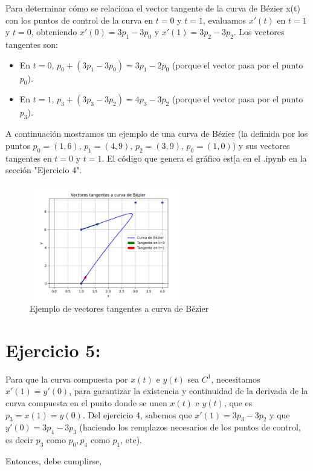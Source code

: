 \documentclass{article}
\begin{document}
Para determinar cómo se relaciona el vector tangente de la curva de Bézier x(t) con los puntos de control de la curva en $t=0$ y $t=1$, evaluamos $x'(t)$ en $t = 1$ y $t = 0$, obteniendo $x'(0) = 3p_1-3p_0$ y $x'(1) = 3p_2-3p_2$. Los vectores tangentes son:
\begin{itemize}
    \item En $t = 0$, $p_0 + (3p_1-3p_0) = 3p_1-2p_0$ (porque el vector pasa por el punto $p_0$).
    \item En $t = 1$, $p_3 +  (3p_3-3p_2) =  4p_3-3p_2$ (porque el vector pasa por el punto $p_3$).
\end{itemize}

A continuación mostramos un ejemplo de una curva de Bézier (la definida por los puntos $p_0 = (1, 6)$, $p_1 = (4, 9)$, $p_2 = (3, 9)$, $p_0 = (1, 0)$) y sus vectores tangentes en $t = 0$ y $t = 1$. El código que genera el gráfico est[a en el .ipynb en la sección "Ejercicio 4".

\begin{figure}[H]
    \centering
    \includegraphics[width=0.6\textwidth]{imagenes/ej4.png}
    \caption{Ejemplo de vectores tangentes a curva de Bézier}
    \label{fig:ejemplo}
\end{figure}

\section*{Ejercicio 5:}
Para que la curva compuesta por $x(t)$ e $y(t)$ sea $C^1$, necesitamos $x'(1) = y'(0)$, para garantizar la existencia y continuidad de la derivada de la curva compuesta en el punto donde se unen $x(t)$ e $y(t)$, que es $p_3 = x(1) = y(0)$. Del ejercicio 4, sabemos que $x'(1) = 3p_3-3p_2$ y que $y'(0) = 3p_4-3p_3$ (haciendo los remplazos necesarios de los puntos de control, es decir $p_3$ como $p_0, p_4$ como $p_1$, etc).

Entonces, debe cumplirse,
\end{document}
